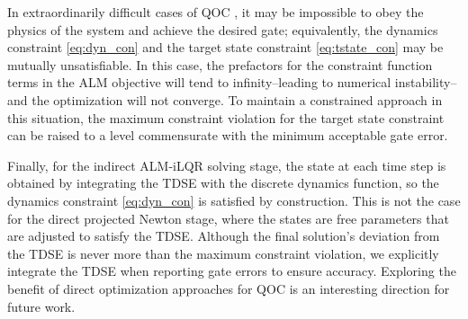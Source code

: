 In extraordinarily difficult cases of
QOC \cite{abdelhafez2020universal}, it may be impossible
to obey the physics of the system and achieve the desired gate;
equivalently, the dynamics constraint \eqref{eq:dyn_con}
and the target state constraint \eqref{eq:tstate_con} may be mutually unsatisfiable.
In this case, the prefactors for the constraint function terms
in the ALM objective will tend to infinity--leading to numerical instability--and the
optimization will not converge. To maintain a constrained approach in this situation,
the maximum constraint violation for the target state constraint can be raised
to a level commensurate with the minimum acceptable gate error.

Finally, for the indirect ALM-iLQR solving stage,
the state at each time step is obtained by integrating
the TDSE with the discrete dynamics function,
so the dynamics constraint \eqref{eq:dyn_con} is satisfied by construction.
This is not the case for the direct projected Newton stage, where the states
are free parameters that are adjusted to satisfy the TDSE.
Although the final solution's deviation from the TDSE is never more than the maximum constraint violation,
we explicitly integrate the TDSE when reporting gate errors to ensure accuracy.
Exploring the benefit of direct optimization approaches for QOC is an interesting direction for future work.
